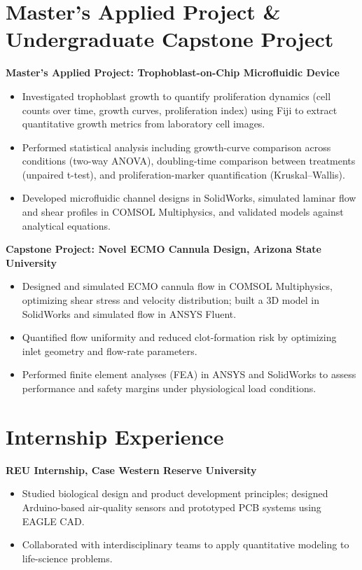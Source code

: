 \documentclass[10.5pt]{article}
\newcommand{\cventry}[2]{%
  \par\noindent\textbf{#1}\hfill\makebox[1.4in][r]{#2}\par
}
\begin{document}
\section*{Master's Applied Project \& Undergraduate Capstone Project}

\cventry{Master's Applied Project: Trophoblast-on-Chip Microfluidic Device}{2022}
\begin{itemize}
  \item Investigated trophoblast growth to quantify proliferation dynamics (cell counts over time, growth curves,
  proliferation index) using Fiji to extract quantitative growth metrics from laboratory cell images.
  \item Performed statistical analysis including growth-curve comparison across conditions (two-way ANOVA),
  doubling-time comparison between treatments (unpaired t-test), and proliferation-marker quantification (Kruskal--Wallis).
  \item Developed microfluidic channel designs in SolidWorks, simulated laminar flow and shear profiles in COMSOL
  Multiphysics, and validated models against analytical equations.
\end{itemize}

\cventry{Capstone Project: Novel ECMO Cannula Design, Arizona State University}{2021}
\begin{itemize}
  \item Designed and simulated ECMO cannula flow in COMSOL Multiphysics, optimizing shear stress and velocity
  distribution; built a 3D model in SolidWorks and simulated flow in ANSYS Fluent.
  \item Quantified flow uniformity and reduced clot-formation risk by optimizing inlet geometry and flow-rate parameters.
  \item Performed finite element analyses (FEA) in ANSYS and SolidWorks to assess performance and safety margins
  under physiological load conditions.
\end{itemize}

\section*{Internship Experience}

\cventry{REU Internship, Case Western Reserve University}{2020}
\begin{itemize}
  \item Studied biological design and product development principles; designed Arduino-based air-quality sensors
  and prototyped PCB systems using EAGLE CAD.
  \item Collaborated with interdisciplinary teams to apply quantitative modeling to life-science problems.
\end{itemize}
\end{document}
